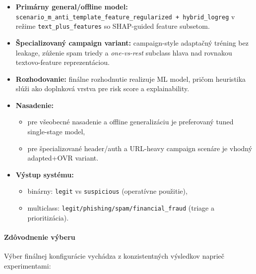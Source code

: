 \documentclass[conference]{IEEEtran}
\begin{document}
\begin{itemize}
    \item \textbf{Primárny general/offline model:} \texttt{scenario\_m\_anti\_template\_feature\_regularized + hybrid\_logreg} v režime \texttt{text\_plus\_features} so SHAP-guided feature subsetom.
    \item \textbf{Špecializovaný campaign variant:} campaign-style adaptačný tréning bez leakage, zúženie spam triedy a \textit{one-vs-rest} subclass hlava nad rovnakou textovo-feature reprezentáciou.
    \item \textbf{Rozhodovanie:} finálne rozhodnutie realizuje ML model, pričom heuristika slúži ako doplnková vrstva pre risk score a explainability.
    \item \textbf{Nasadenie:}
    \begin{itemize}
        \item pre všeobecné nasadenie a offline generalizáciu je preferovaný tuned single-stage model,
        \item pre špecializované header/auth a URL-heavy campaign scenáre je vhodný adapted+OVR variant.
    \end{itemize}
    \item \textbf{Výstup systému:}
    \begin{itemize}
        \item binárny: \texttt{legit} vs \texttt{suspicious} (operatívne použitie),
        \item multiclass: \texttt{legit/phishing/spam/financial\_fraud} (triage a prioritizácia).
    \end{itemize}
\end{itemize}

\paragraph{Zdôvodnenie výberu}

Výber finálnej konfigurácie vychádza z konzistentných výsledkov naprieč experimentami:
\end{document}
